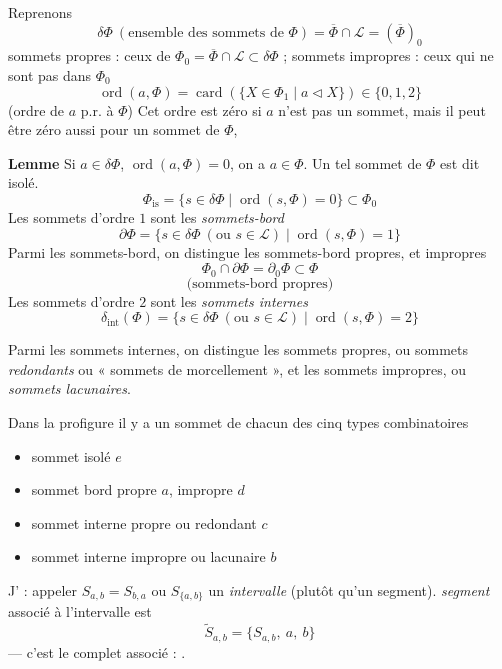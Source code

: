 \documentclass[11pt,a4paper]{article}
\begin{document}
Reprenons
\[ \delta\Phi \ (\text{ensemble des sommets de } \Phi) = \overline{\Phi}\cap\mathcal{L} = (\overline{\Phi})_0 \]
sommets propres : ceux de $\Phi_0=\overline{\Phi}\cap\mathcal{L}\subset\delta\Phi$ ;
sommets impropres : ceux qui ne sont pas dans $\Phi_0$
\[ \operatorname{ord}(a,\Phi) = \operatorname{card}(\{X\in\Phi_1 \mid a\triangleleft X\}) \in \{0,1,2\} \]
(ordre de $a$ p.r. à $\Phi$) Cet ordre est zéro si $a$ n'est pas un sommet, mais il peut être zéro aussi pour un sommet de $\Phi$, \struck{\ill{}}

\textbf{Lemme} Si $a\in\delta\Phi$,   $\operatorname{ord}(a,\Phi)=0$, on a $a\in\Phi$. Un tel sommet de $\Phi$ est dit  isolé.
\[ \Phi_{\mathrm{is}} = \{s\in\delta\Phi \mid \operatorname{ord}(s,\Phi)=0\} \subset \Phi_0 \]
Les sommets d'ordre $1$ sont les \emph{sommets-bord}
\[ \partial\Phi = \{s\in\delta\Phi \ (\text{ou } s\in\mathcal{L}) \mid \operatorname{ord}(s,\Phi)=1\} \]
Parmi les sommets-bord, on distingue les sommets-bord propres, et impropres
\[ \Phi_0\cap\partial\Phi = \partial_0\Phi \subset \Phi \]
\[ \text{(sommets-bord propres)} \]
Les sommets d'ordre $2$ sont les \emph{sommets internes}
\[ \delta_{\mathrm{int}}(\Phi) = \{s\in\delta\Phi \ (\text{ou } s\in\mathcal{L}) \mid \operatorname{ord}(s,\Phi)=2\} \]

Parmi les sommets internes, on distingue les sommets propres, ou sommets \emph{redondants} ou « sommets de morcellement », et les sommets impropres, ou \emph{sommets lacunaires}.

Dans la profigure
il y a un sommet de chacun des cinq types combinatoires
\begin{itemize}
\item sommet isolé $e$
\item sommet bord propre $a$, impropre $d$
\item sommet interne propre ou redondant $c$
\item sommet interne impropre ou lacunaire $b$
\end{itemize}

 J'  :  appeler $S_{a,b}=S_{b,a}$ ou $S_{\{a,b\}}$ un \emph{intervalle} (plutôt qu'un segment).   \emph{segment} associé à l'intervalle est
\[ \widetilde{S}_{a,b} = \{S_{a,b},\ a,\ b\} \]
— c'est le  complet associé : \ill{}.
\end{document}
